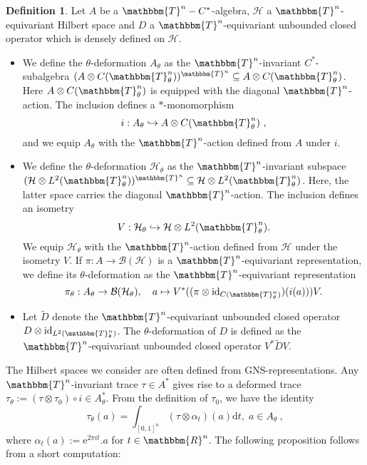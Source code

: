 \documentclass[10pt]{amsart}
\theoremstyle{remark}
\theoremstyle{definition}
\newtheorem{deef}[thm]{Definition}
\begin{document}
\begin{deef}
Let $A$ be a ${\mathbbm{T}}^n-C^*$-algebra, ${\mathcal{H}}$ a ${\mathbbm{T}}^n$-equivariant Hilbert space and $D$ a ${\mathbbm{T}}^n$-equivariant unbounded closed operator which is densely defined on ${\mathcal{H}}$.
\begin{itemize}
\item We define the $\theta$-deformation $A_\theta$ as the ${\mathbbm{T}}^n$-invariant $C^*$-subalgebra $(A\otimes C({\mathbbm{T}}^n_\theta))^{{\mathbbm{T}}^n}\subseteq A\otimes C({\mathbbm{T}}^n_\theta)$. Here $A\otimes C({\mathbbm{T}}^n_\theta)$ is equipped with the diagonal ${\mathbbm{T}}^n$-action. The inclusion defines a $*$-monomorphism 
$$i:A_\theta\hookrightarrow A\otimes C({\mathbbm{T}}^n_\theta)\ ,$$
and we equip $A_\theta$ with the ${\mathbbm{T}}^n$-action defined from $A$ under $i$.
\item We define the $\theta$-deformation ${\mathcal{H}}_\theta$ as the ${\mathbbm{T}}^n$-invariant subspace $({\mathcal{H}}\otimes L^2({\mathbbm{T}}^n_\theta))^{{\mathbbm{T}}^n}\subseteq {\mathcal{H}}\otimes L^2({\mathbbm{T}}^n_\theta)$. Here, the latter space carries the diagonal ${\mathbbm{T}}^n$-action. The inclusion defines an isometry  
$$V:{\mathcal{H}}_\theta\hookrightarrow {\mathcal{H}}\otimes L^2({\mathbbm{T}}^n_\theta).$$
We equip ${\mathcal{H}}_\theta$ with the ${\mathbbm{T}}^n$-action defined from ${\mathcal{H}}$ under the isometry $V$. If $\pi:A\to {\mathcal{B}}({\mathcal{H}})$ is a ${\mathbbm{T}}^n$-equivariant representation, we define its $\theta$-deformation as the ${\mathbbm{T}}^n$-equivariant representation 
$$\pi_\theta:A_\theta\to {\mathcal{B}}({\mathcal{H}}_\theta),\quad a\mapsto V^*((\pi\otimes \mathrm{id}_{C({\mathbbm{T}}^n_\theta)})(i(a)))V.$$
\item Let $\tilde{D}$ denote the ${\mathbbm{T}}^n$-equivariant unbounded closed operator $D\otimes { \mathrm{id}}_{L^2({\mathbbm{T}}^n_\theta)}$. The $\theta$-deformation of $D$ is defined as the ${\mathbbm{T}}^n$-equivariant unbounded closed operator $V^*\tilde{D}V$.
\end{itemize}
\end{deef} 

The Hilbert spaces we consider are often defined from GNS-representations. Any ${\mathbbm{T}}^n$-invariant trace $\tau\in A^*$ gives rise to a deformed trace $\tau_\theta:=(\tau\otimes \tau_0)\circ i\in A_\theta^*$. From the definition of $\tau_0$, we have the identity 
$$\tau_\theta(a)=\int_{[0,1]^n} (\tau\otimes\alpha_t)(a){\mathrm{d}} t, \; a\in A_\theta\ ,$$ 
where $\alpha_t(a):={\mathrm{e}}^{2\pi it}.a$ for $t\in {\mathbbm{R}}^n$. The following proposition follows from a short computation:
\end{document}
